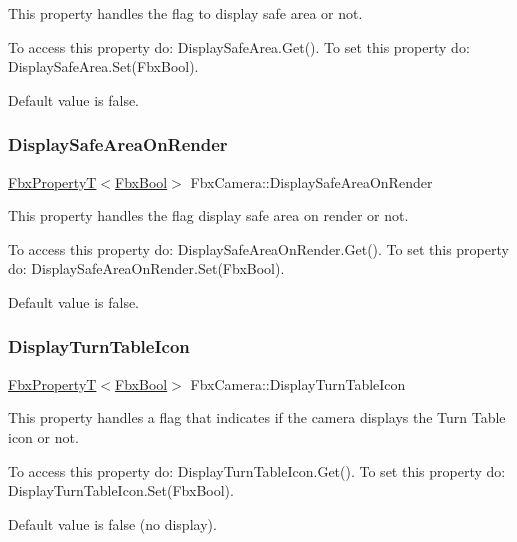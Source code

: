 This property handles the flag to display safe area or not.

To access this property do\+: Display\+Safe\+Area.\+Get(). To set this property do\+: Display\+Safe\+Area.\+Set(\+Fbx\+Bool).

Default value is false. \mbox{\label{class_fbx_camera_a6fba1dac4e237b8fb5423c6e8fdb7586}} 
\subsubsection{\texorpdfstring{Display\+Safe\+Area\+On\+Render}{DisplaySafeAreaOnRender}}
{\footnotesize\ttfamily \hyperlink{class_fbx_property_t}{Fbx\+PropertyT}$<$\hyperlink{fbxtypes_8h_a92e0562b2fe33e76a242f498b362262e}{Fbx\+Bool}$>$ Fbx\+Camera\+::\+Display\+Safe\+Area\+On\+Render}

This property handles the flag display safe area on render or not.

To access this property do\+: Display\+Safe\+Area\+On\+Render.\+Get(). To set this property do\+: Display\+Safe\+Area\+On\+Render.\+Set(\+Fbx\+Bool).

Default value is false. \mbox{\label{class_fbx_camera_a935e9b57e229b7474770b0a0611a1b60}} 
\subsubsection{\texorpdfstring{Display\+Turn\+Table\+Icon}{DisplayTurnTableIcon}}
{\footnotesize\ttfamily \hyperlink{class_fbx_property_t}{Fbx\+PropertyT}$<$\hyperlink{fbxtypes_8h_a92e0562b2fe33e76a242f498b362262e}{Fbx\+Bool}$>$ Fbx\+Camera\+::\+Display\+Turn\+Table\+Icon}

This property handles a flag that indicates if the camera displays the Turn Table icon or not.

To access this property do\+: Display\+Turn\+Table\+Icon.\+Get(). To set this property do\+: Display\+Turn\+Table\+Icon.\+Set(\+Fbx\+Bool).

Default value is false (no display). \mbox{\label{class_fbx_camera_a72de3e07e3d77face8a1412599facf73}} 
